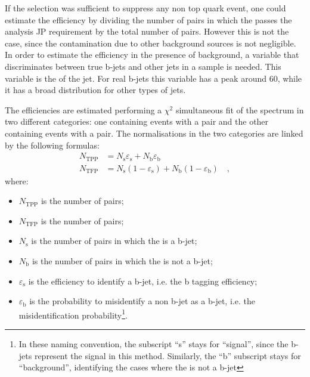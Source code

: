 If the \tg selection was sufficient to suppress any non top quark event, one could estimate the efficiency by dividing the number of \tp pairs in which the \probe passes the analysis JP requirement by the total number of \tp pairs. However this is not the case, since the contamination due to other background sources is not negligible. In order to estimate the efficiency in the presence of background, a variable that discriminates between true b-jets and other jets in a \ttbar sample is needed. This variable is the \pt of the \probe jet. For real b-jets this variable has a peak around 60\GeV, while it has a broad distribution for other types of jets.

The efficiencies are estimated performing a $\chi^{2}$ simultaneous fit of the \probe \pt spectrum in two different categories: one containing events with a \tpp pair and the other containing events with a \tfp pair. The normalisations in the two categories are linked by the following formulas:
\begin{equation}
\begin{split}
N_\mathrm{TPP} &= N_\mathrm{s} \varepsilon_\mathrm{s} + N_\mathrm{b} \varepsilon_\mathrm{b} \\
N_\mathrm{TFP} &= N_\mathrm{s} (1 -\varepsilon_\mathrm{s}) + N_\mathrm{b} ( 1 - \varepsilon_\mathrm{b}) \quad,
\end{split}
\end{equation}
\noindent where:
\begin{itemize}
\item $N_\mathrm{TPP}$ is the number of \tpp pairs;
\item $N_\mathrm{TFP}$ is the number of \tfp pairs;
\item $N_\mathrm{s}$ is the number of \tp pairs in which the \probe is a b-jet;
\item $N_\mathrm{b}$ is the number of \tp pairs in which the \probe is not a b-jet;
\item $\varepsilon_\mathrm{s}$ is the efficiency to identify a b-jet, i.e. the b tagging efficiency;
\item $\varepsilon_\mathrm{b}$ is the probability to misidentify a non b-jet as a b-jet, i.e. the misidentification probability\footnote{In these naming convention, the subscript ``s'' stays for ``signal'', since the b-jets represent the signal in this method. Similarly, the ``b'' subscript stays for ``background'', identifying the cases where the \probe is not a b-jet}.
\end{itemize}

